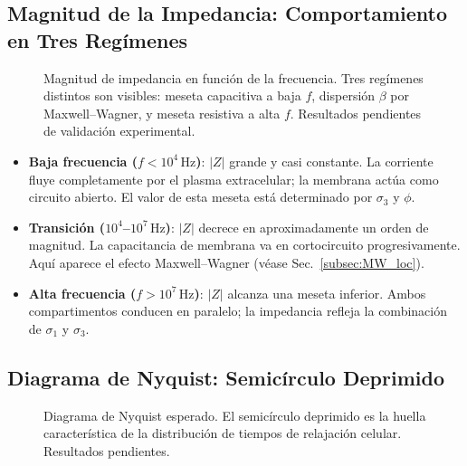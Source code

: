 \documentclass[12pt]{article}
\begin{document}
\subsection{Magnitud de la Impedancia: Comportamiento en Tres Reg\'imenes}

\begin{figure}[H]
\centering
{}
\caption{Magnitud de impedancia en funci\'on de la frecuencia. Tres reg\'imenes distintos
son visibles: meseta capacitiva a baja $f$, dispersi\'on $\beta$ por Maxwell--Wagner, y
meseta resistiva a alta $f$. Resultados pendientes de validaci\'on experimental.}
\label{fig:Zmag}
\end{figure}

\begin{itemize}

\item \textbf{Baja frecuencia ($f < 10^4\,\text{Hz}$)}: $|Z|$ grande y casi constante.
La corriente fluye completamente por el plasma extracelular; la membrana act\'ua como
circuito abierto. El valor de esta meseta est\'a determinado por $\sigma_3$ y $\phi$.
\item \textbf{Transici\'on ($10^4$--$10^7\,\text{Hz}$)}: $|Z|$ decrece en
aproximadamente un orden de magnitud. La capacitancia de membrana va en cortocircuito
progresivamente. Aqu\'i aparece el efecto Maxwell--Wagner (v\'ease Sec.~\ref{subsec:MW_loc}).
\item \textbf{Alta frecuencia ($f > 10^7\,\text{Hz}$)}: $|Z|$ alcanza una meseta
inferior. Ambos compartimentos conducen en paralelo; la impedancia refleja la
combinaci\'on de $\sigma_1$ y $\sigma_3$.
\end{itemize}

\subsection{Diagrama de Nyquist: Semic\'irculo Deprimido}

\begin{figure}[H]
\centering
{}
\caption{Diagrama de Nyquist esperado. El semic\'irculo deprimido es la huella
caracter\'istica de la distribuci\'on de tiempos de relajaci\'on celular.
Resultados pendientes.}
\label{fig:nyquist}
\end{figure}
\end{document}
